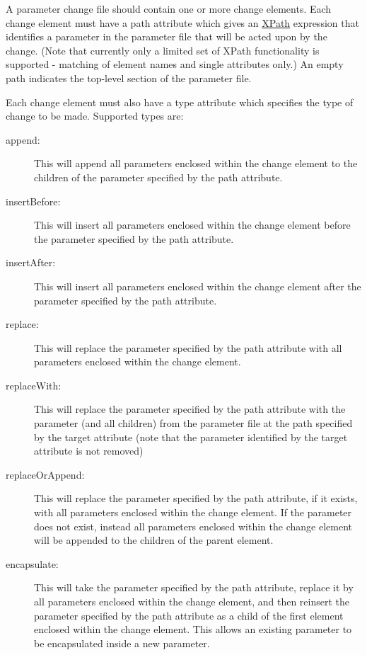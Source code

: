 A parameter change file should contain one or more change elements. Each change element must have a {\normalfont \ttfamily path} attribute which gives an \href{http://www.w3schools.com/Xml/xpath_syntax.asp}{XPath} expression that identifies a parameter in the parameter file that will be acted upon by the change. (Note that currently only a limited set of XPath functionality is supported - matching of element names and single attributes only.) An empty path indicates the top-level section of the parameter file.

Each change element must also have a {\normalfont \ttfamily type} attribute which specifies the type of change to be made. Supported types are:
\begin{description}
\item[{\normalfont \ttfamily append}:] This will append all parameters enclosed within the change element to the children of the parameter specified by the {\normalfont \ttfamily path} attribute.
\item[{\normalfont \ttfamily insertBefore}:] This will insert all parameters enclosed within the change element before the parameter specified by the {\normalfont \ttfamily path} attribute.
\item[{\normalfont \ttfamily insertAfter}:] This will insert all parameters enclosed within the change element after the parameter specified by the {\normalfont \ttfamily path} attribute.
\item[{\normalfont \ttfamily replace}:] This will replace the parameter specified by the {\normalfont \ttfamily path} attribute with all parameters enclosed within the change element.
\item[{\normalfont \ttfamily replaceWith}:] This will replace the parameter specified by the {\normalfont \ttfamily path} attribute with the parameter (and all children) from the parameter file at the path specified by the {\normalfont \ttfamily target} attribute (note that the parameter identified by the {\normalfont \ttfamily target} attribute is not removed)
\item[{\normalfont \ttfamily replaceOrAppend}:] This will replace the parameter specified by the {\normalfont \ttfamily path} attribute, if it exists, with all parameters enclosed within the change element. If the parameter does not exist, instead all parameters enclosed within the change element will be appended to the children of the parent element.
\item[{\normalfont \ttfamily encapsulate}:] This will take the parameter specified by the {\normalfont \ttfamily path} attribute, replace it by all parameters enclosed within the change element, and then reinsert the parameter specified by the {\normalfont \ttfamily path} attribute as a child of the first element enclosed within the change element. This allows an existing parameter to be encapsulated inside a new parameter.

\end{description}

